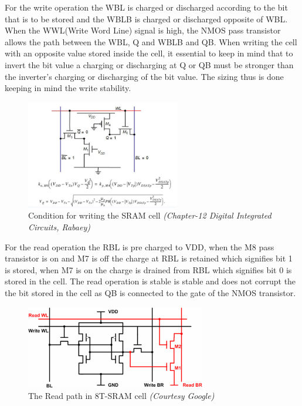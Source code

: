 For the write operation the WBL is charged or discharged according to the bit that is to be stored and the WBLB is charged or discharged opposite of WBL. When the WWL(Write Word Line) signal is high, the NMOS pass transistor allows the path between the WBL, Q and WBLB and QB. When writing the cell with an opposite value stored inside the cell, it essential to keep in mind that to invert the bit value a charging or discharging at Q or QB must be stronger than the inverter's charging or discharging of the bit value. The sizing thus is done keeping in mind the write stability.

\begin{figure}[H]
\centering
\includegraphics[width=0.6\textwidth]{writes.JPG}
\caption{Condition for writing the SRAM cell \emph{ (Chapter-12 Digital Integrated Circuits, Rabaey)}}
\label{fig:Figure}
\end{figure}

For the read operation the RBL is pre charged to VDD, when the M8 pass transistor is on and M7 is off the charge at RBL is retained which signifies bit 1 is stored, when M7 is on the charge is drained from RBL which signifies bit 0 is stored in the cell. The read operation is stable is stable and does not corrupt the the bit stored in the cell as QB is connected to the gate of the NMOS transistor.

\begin{figure}[H]
\centering
\includegraphics[width=0.7\textwidth]{readsram.jpg}
\caption{The Read path in 8T-SRAM cell \emph{(Courtesy Google)}}
\label{fig:Figure}
\end{figure}

